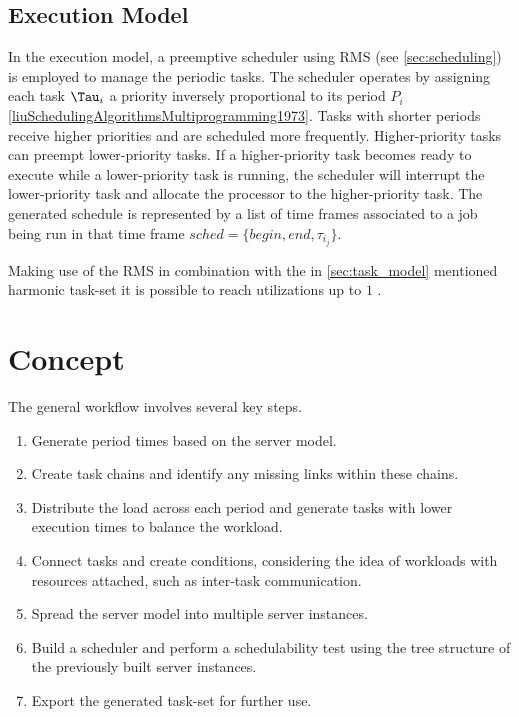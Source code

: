 \subsection{Execution Model}\label{sec:execution_model}
In the execution model, a preemptive scheduler using \ac{RMS} (see \cref{sec:scheduling}) is employed to manage the periodic tasks. 
The scheduler operates by assigning each task $\Tau_i$ a priority inversely proportional to its period $P_i$ \ref{liuSchedulingAlgorithmsMultiprogramming1973}.
Tasks with shorter periods receive higher priorities and are scheduled more frequently.
Higher-priority tasks can preempt lower-priority tasks.
If a higher-priority task becomes ready to execute while a lower-priority task is running, the scheduler will interrupt the lower-priority task and allocate the processor to the higher-priority task.
The generated schedule is represented by a list of time frames associated to a job being run in that time frame $sched = \{begin, end, \tau_{i_j}\}$.

Making use of the \ac{RMS} in combination with the in \cref{sec:task_model} mentioned harmonic task-set it is possible to reach utilizations up to $1$ \cite{liuSchedulingAlgorithmsMultiprogramming1973}.


\cite{dar-tzenpengAssignmentSchedulingCommunicating1997}


\section{Concept}
\label{sec:concept}
The general workflow involves several key steps. 
\begin{enumerate}
	\item Generate period times based on the server model.
	\item Create task chains and identify any missing links within these chains.
	\item Distribute the load across each period and generate tasks with lower execution times to balance the workload.
	\item Connect tasks and create conditions, considering the idea of workloads with resources attached, such as inter-task communication.
	\item Spread the server model into multiple server instances.
	\item Build a scheduler and perform a schedulability test using the tree structure of the previously built server instances.
	\item Export the generated task-set for further use.
\end{enumerate}

